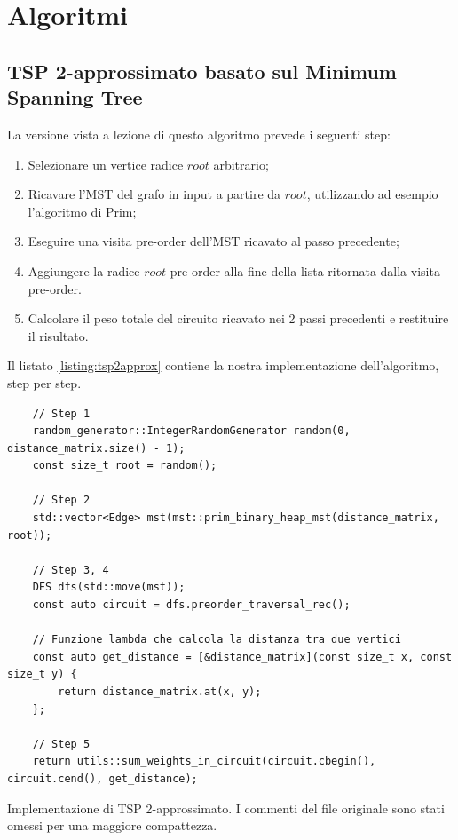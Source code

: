
\section{Algoritmi}
\label{cap:algorithms}

\subsection{TSP 2-approssimato basato sul Minimum Spanning Tree}

La versione vista a lezione di questo algoritmo prevede i seguenti step:

\begin{enumerate}
    \item Selezionare un vertice radice $root$ arbitrario;
    \item Ricavare l'MST del grafo in input a partire da $root$, utilizzando ad esempio l'algoritmo di Prim;
    \item Eseguire una visita pre-order dell'MST ricavato al passo precedente;
    \item Aggiungere la radice $root$ pre-order alla fine della lista ritornata dalla visita pre-order.
    \item Calcolare il peso totale del circuito ricavato nei 2 passi precedenti e restituire il risultato.
\end{enumerate}

\noindent Il listato \ref{listing:tsp2approx} contiene la nostra implementazione dell'algoritmo, step per step.\\

\begin{listing}[!ht]
\begin{verbatim}
    // Step 1
    random_generator::IntegerRandomGenerator random(0, distance_matrix.size() - 1);
    const size_t root = random();

    // Step 2
    std::vector<Edge> mst(mst::prim_binary_heap_mst(distance_matrix, root));

    // Step 3, 4
    DFS dfs(std::move(mst));
    const auto circuit = dfs.preorder_traversal_rec();
    
    // Funzione lambda che calcola la distanza tra due vertici
    const auto get_distance = [&distance_matrix](const size_t x, const size_t y) {
        return distance_matrix.at(x, y);
    };
    
    // Step 5
    return utils::sum_weights_in_circuit(circuit.cbegin(), circuit.cend(), get_distance);
\end{verbatim}
\caption{Implementazione di TSP 2-approssimato. I commenti del file originale sono stati omessi per una maggiore compattezza.}
\label{listing:tsp2approx}
\end{listing}


